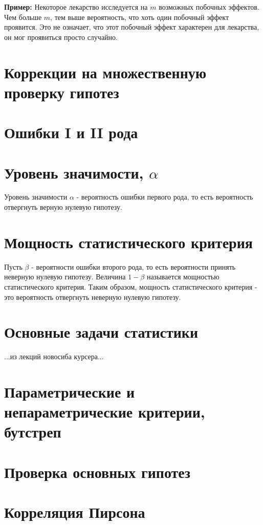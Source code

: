 \textbf{Пример:} Некоторое лекарство исследуется на $m$ возможных побочных эффектов. Чем больше $m$, тем выше вероятность, что хоть один побочный эффект проявится. Это не означает, что этот побочный эффект характерен для лекарства, он мог проявиться просто случайно.

\section{Коррекции на множественную проверку гипотез}

\section{Ошибки I и II рода}


\section{Уровень значимости, $\alpha$}

Уровень значимости $\alpha$ - вероятность ошибки первого рода, то есть вероятность отвергнуть верную нулевую гипотезу.


\section{Мощность статистического критерия}

Пусть $\beta$ - вероятности ошибки второго рода, то есть вероятности принять неверную нулевую гипотезу. Величина $1 - \beta$ называется мощностью статистического критерия. Таким образом, мощность статистического критерия - это вероятность отвергнуть неверную нулевую гипотезу.

\section{Основные задачи статистики}

...из лекций новосиба  курсера...


\section{Параметрические и непараметрические критерии, бутстреп}


\section{Проверка основных гипотез}


\section{Корреляция Пирсона}


